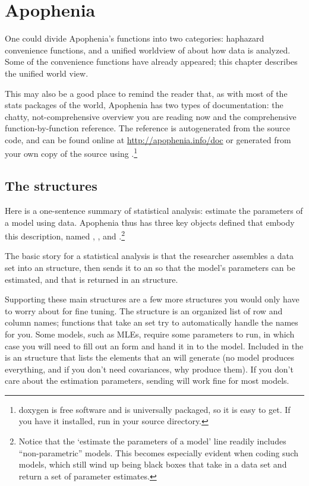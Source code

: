\chapter{Apophenia} \label{apop}

One could divide Apophenia's functions into two categories: haphazard
convenience functions, and a unified worldview of about how data is
analyzed. Some of the convenience functions have already appeared; this
chapter describes the unified world view. 

This may also be a good place to remind the reader that, as with most of
the stats packages of the world, Apophenia has two types of
documentation: the chatty, not-comprehensive overview you are reading now and the
comprehensive function-by-function reference. The reference is autogenerated from the
source code, and can be found online at \url{http://apophenia.info/doc}
or generated from your own copy of the source using .\footnote{doxygen is free software and is universally packaged,
so it is easy to get. If you have it installed, run  in
your source directory.}

\section{The structures}
Here is a one-sentence summary of statistical analysis: estimate the
parameters of a model
using data. Apophenia thus has three key objects defined that embody
this description, named , , and 
.\footnote{Notice that the `estimate the parameters of a
model' line readily includes ``non-parametric'' models. This becomes
especially evident when coding such models, which still wind up being
black boxes that take in a data set and return a set of parameter
estimates.}

The basic story for a statistical analysis is that the researcher
assembles a data set into an  structure, then sends it to
an  so that the model's parameters can be estimated,
and that is returned in an  structure.

Supporting these main structures are a few more structures you would only
have to worry about for fine tuning.  The  structure is
an organized list of row and column names; functions that take an 
 set try to automatically handle the names for you. 
Some models, such as MLEs, require some parameters to run, in
which case you will need to fill out an 
form and hand it in to the model. Included in the
 is an
 structure that lists the elements
that an  will generate (no model produces
everything, and if you don't need covariances, why produce them). If you
don't care about the estimation parameters, sending  will
work fine for most models. 

